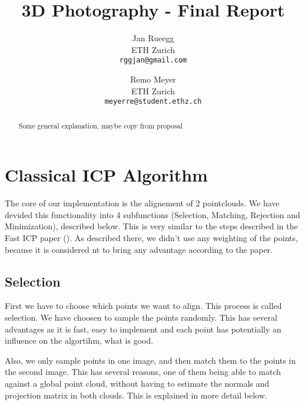 \documentclass[10pt,twocolumn,letterpaper]{article}
\begin{document}
\title{3D Photography - Final Report}

\author{Jan Rueegg\\
ETH Zurich\\
{\tt\small rggjan@gmail.com}
\and
Remo Meyer\\
ETH Zurich\\
{\tt\small meyerre@student.ethz.ch}
}

\maketitle
\thispagestyle{empty}

\begin{abstract}
Some general explanation, maybe copy from proposal %
\end{abstract}

\section{Classical ICP Algorithm}
The core of our implementation is the alignement of 2 pointclouds. 
We have devided this functionality into 4 subfunctions (Selection, Matching, Rejection and Minimization), described below. This is very
similar to the steps described in the Fast ICP paper (\cite{fasticp}). As described there, we didn't use any weighting of the points,
because it is considered nt to bring any advantage according to the paper.

\subsection{Selection}
First we have to choose which points we want to align. This process is called selection. 
We have choosen to sample the points randomly. 
This has several advantages as it is fast, easy to implement and each point has potentially an influence on the algortihm, what is good.

Also, we only sample points in one image, and then match them to the points in the second image. This has several reasons, one of them
being able to match against a global point cloud, without having to estimate the normals and projection matrix in both clouds.
This is explained in more detail below.
\end{document}
